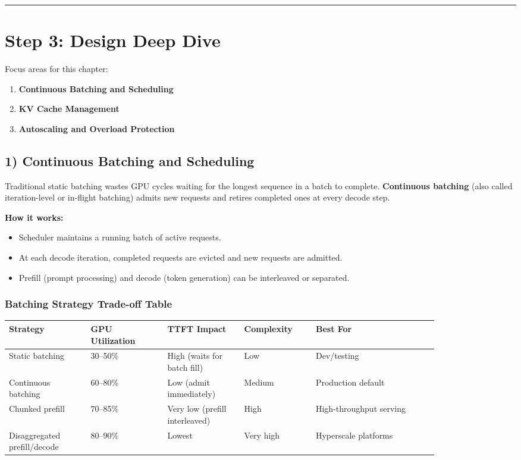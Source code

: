 \bigskip\hrule\bigskip

\section*{Step 3: Design Deep Dive}

Focus areas for this chapter:

\begin{enumerate}
  \item \textbf{Continuous Batching and Scheduling}
  \item \textbf{KV Cache Management}
  \item \textbf{Autoscaling and Overload Protection}
\end{enumerate}

\subsection*{1) Continuous Batching and Scheduling}

Traditional static batching wastes GPU cycles waiting for the longest sequence in a batch to complete. \textbf{Continuous batching} (also called iteration-level or in-flight batching) admits new requests and retires completed ones at every decode step.

\textbf{How it works:}

\begin{itemize}
  \item Scheduler maintains a running batch of active requests.
  \item At each decode iteration, completed requests are evicted and new requests are admitted.
  \item Prefill (prompt processing) and decode (token generation) can be interleaved or separated.
\end{itemize}

\subsubsection*{Batching Strategy Trade-off Table}

\small
\begin{tabular}{|p{0.16\linewidth}|p{0.15\linewidth}|p{0.15\linewidth}|p{0.14\linewidth}|p{0.24\linewidth}|}
\hline
\textbf{Strategy} & \textbf{GPU Utilization} & \textbf{TTFT Impact} & \textbf{Complexity} & \textbf{Best For} \\
\hline
Static batching & 30--50\% & High (waits for batch fill) & Low & Dev/testing \\
\hline
Continuous batching & 60--80\% & Low (admit immediately) & Medium & Production default \\
\hline
Chunked prefill & 70--85\% & Very low (prefill interleaved) & High & High-throughput serving \\
\hline
Disaggregated prefill/decode & 80--90\% & Lowest & Very high & Hyperscale platforms \\
\hline
\end{tabular}
\normalsize

